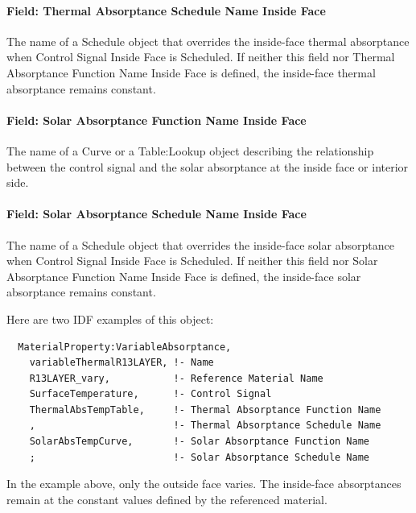 \paragraph{Field: Thermal Absorptance Schedule Name Inside Face}\label{field-thermal-absorptance-schedule-name-inside-face}

The name of a Schedule object that overrides the inside-face thermal absorptance when Control Signal Inside Face is Scheduled. If neither this field nor Thermal Absorptance Function Name Inside Face is defined, the inside-face thermal absorptance remains constant.

\paragraph{Field: Solar Absorptance Function Name Inside Face}\label{field-solar-absorptance-function-name-inside-face}

The name of a Curve or a Table:Lookup object describing the relationship between the control signal and the solar absorptance at the inside face or interior side.

\paragraph{Field: Solar Absorptance Schedule Name Inside Face}\label{field-solar-absorptance-schedule-name-inside-face}

The name of a Schedule object that overrides the inside-face solar absorptance when Control Signal Inside Face is Scheduled. If neither this field nor Solar Absorptance Function Name Inside Face is defined, the inside-face solar absorptance remains constant.

Here are two IDF examples of this object:

\begin{lstlisting}
  MaterialProperty:VariableAbsorptance,
    variableThermalR13LAYER, !- Name
    R13LAYER_vary,           !- Reference Material Name
    SurfaceTemperature,      !- Control Signal
    ThermalAbsTempTable,     !- Thermal Absorptance Function Name
    ,                        !- Thermal Absorptance Schedule Name
    SolarAbsTempCurve,       !- Solar Absorptance Function Name
    ;                        !- Solar Absorptance Schedule Name
\end{lstlisting}

In the example above, only the outside face varies. The inside-face absorptances remain at the constant values defined by the referenced material.

